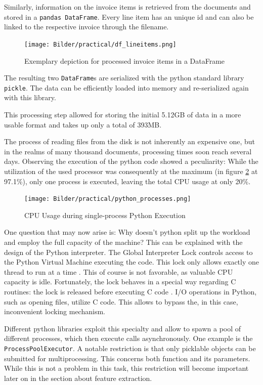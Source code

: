 	Similarly, information on the invoice items is retrieved from the documents and stored in a \lstinline|pandas DataFrame|. Every line item has an unique id and can also be linked to the respective invoice through the filename.
	
	\begin{figure}[ht]
		\centering
		\texttt{[image: Bilder/practical/df\_lineitems.png]}
		\caption{Exemplary depiction for processed invoice items in a DataFrame}
		\label{fig:df-invoice}
	\end{figure}
	
	The resulting two \lstinline|DataFrame|s are serialized with the python standard library \lstinline|pickle|. The data can be efficiently loaded into memory and re-serialized again with this library.
	
	This processing step allowed for storing the initial 5.12GB of data in a more usable format and takes up only a total of 393MB.

	The process of reading files from the disk is not inherently an expensive one, but in the realms of many thousand documents, processing times soon reach several days. Observing the execution of the python code showed a peculiarity: While the utilization of the used processor was consequently at the maximum (in figure \ref{fig:cpu} at 97.1\%), only one process is executed, leaving the total \ac{CPU} usage at only 20\%. 
	
	\begin{figure}[ht]
		\centering
		\texttt{[image: Bilder/practical/python\_processes.png]}
		\caption{\ac{CPU} Usage during single-process Python Execution}
		\label{fig:cpu}
	\end{figure}
	
	
	One question that may now arise is: Why doesn't python split up the workload and employ the full capacity of the machine?
	This can be explained with the design of the Python interpreter. The Global Interpreter Lock controls access to the Python Virtual Machine executing the code. This lock only allows exactly one thread to run at a time \cite{corePython}. This of course is not favorable, as valuable CPU capacity is idle. Fortunately, the lock behaves in a special way regarding C routines: the lock is released before executing C code \cite{corePython}. I/O operations in Python, such as opening files, utilize C code. This allows to bypass the, in this case, inconvenient locking mechanism. 
	
	Different python libraries exploit this specialty and allow to spawn a pool of different processes, which then execute calls asynchronously. One example is the \lstinline|ProcessPoolExecutor|. A notable restriction is that only picklable objects can be submitted for multiprocessing. This concerns both function and its parameters. While this is not a problem in this task, this restriction will become important later on in the section about feature extraction.
	
